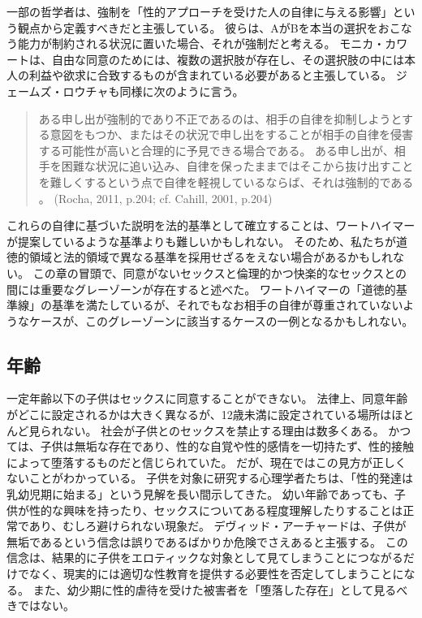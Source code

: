 \documentclass[paper=a4,book,openany]{jlreq}
\newcommand{\ig}[1]{}           %
\begin{document}
一部の哲学者は、強制を「性的アプローチを受けた人の自律に与える影響」という観点から定義すべきだと主張している。
彼らは、AがBを本当の選択をおこなう能力が制約される状況に置いた場合、それが強制だと考える。
モニカ・カワート\ig{Monica Cowart}は、自由な同意のためには、複数の選択肢が存在し、その選択肢の中には本人の利益や欲求に合致するものが含まれている必要があると主張している\citep{cowart04:_under_acts_consen}。
ジェームズ・ロウチャも同様に次のように言う。

\begin{quote}
ある申し出が強制的であり不正であるのは、相手の自律を抑制しようとする意図をもつか、またはその状況で申し出をすることが相手の自律を侵害する可能性が高いと合理的に予見できる場合である。
ある申し出が、相手を困難な状況に追い込み、自律を保ったままではそこから抜け出すことを難しくするという点で自律を軽視しているならば、それは強制的である  \nocite{rocha11:_sexual_haras_coerc_offer} \nocite{cahill01:_rethin_rape}。
(Rocha, 2011, p.204; cf. Cahill, 2001, p.204)

\end{quote}

これらの自律に基づいた説明を法的基準として確立することは、ワートハイマーが提案しているような基準よりも難しいかもしれない。
そのため、私たちが道徳的領域と法的領域で異なる基準を採用せざるをえない場合があるかもしれない。
この章の冒頭で、同意がないセックスと倫理的かつ快楽的なセックスとの間には重要なグレーゾーンが存在すると述べた。
ワートハイマーの「道徳的基準線」の基準を満たしているが、それでもなお相手の自律が尊重されていないようなケースが、このグレーゾーンに該当するケースの一例となるかもしれない。

\subsection{年齢}

一定年齢以下の子供はセックスに同意することができない。
法律上、同意年齢がどこに設定されるかは大きく異なるが、12歳未満に設定されている場所はほとんど見られない。
社会が子供とのセックスを禁止する理由は数多くある。
かつては、子供は無垢な存在であり、性的な自覚や性的感情を一切持たず、性的接触によって堕落するものだと信じられていた。
だが、現在ではこの見方が正しくないことがわかっている。
子供を対象に研究する心理学者たちは、「性的発達は乳幼児期に始まる」という見解を長い間示してきた\citep{louie19:_sexual_behav_child}。
幼い年齢であっても、子供が性的な興味を持ったり、セックスについてある程度理解したりすることは正常であり、むしろ避けられない現象だ。
デヴィッド・アーチャードは、子供が無垢であるという信念は誤りであるばかりか危険でさえあると主張する。
この信念は、結果的に子供をエロティックな対象として見てしまうことにつながるだけでなく、現実的には適切な性教育を提供する必要性を否定してしまうことになる\citep[pp. 118--119]{archard98:_sexual_consen}。
また、幼少期に性的虐待を受けた被害者を「堕落した存在」として見るべきではない。
\end{document}
